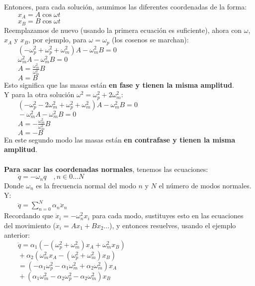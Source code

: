 \documentclass[a4paper,landscape,10pt]{cheatsheet}
\begin{document}
Entonces, para cada solución, asumimos las diferentes coordenadas de la forma:\\
$\qquad x_A=A\cos\omega t$\\
$\qquad x_B=B\cos\omega t$\\

Reemplazamos de nuevo (usando la primera ecuación es suficiente), ahora con $\omega$,
$x_A$ y $x_B$, por ejemplo, para $\omega=\omega_p$ (los cosenos se marchan):\\
$\qquad (-\omega_p^2+\omega_p^2+\omega_m^2)A-\omega_m^2B=0$\\
$\qquad \omega_m^2A-\omega_m^2B=0$\\
$\qquad A=\frac{\omega_m^2}{\omega_m^2}B$\\
$\qquad A=B$\\

Esto significa que las masas están \textbf{en fase y tienen la misma amplitud}.\\
Y para la otra solución $\omega^2=\omega_p^2+2\omega_m^2$:\\
$\qquad (-\omega_p^2-2\omega_m^2+\omega_p^2+\omega_m^2)A-\omega_m^2B=0$\\
$\qquad -\omega_m^2A-\omega_m^2B=0$\\
$\qquad A=-\frac{\omega_m^2}{\omega_m^2}B$\\
$\qquad A=-B$\\
En este segundo modo las masas están \textbf{en contrafase y tienen la misma amplitud}.\\
\hfill\\
\textbf{Para sacar las coordenadas normales}, tenemos las ecuaciones:\\
$\qquad \ddot{q}=-\omega_n q\quad,n\in{0...N}$\\
Donde $\omega_n$ es la frecuencia normal del modo $n$ y $N$ el número de modos normales. Y:\\
$\qquad \ddot{q}=\sum_{n=0}^{N}\alpha_n\ddot{x}_n$\\
Recordando que $\ddot{x}_i=-\omega_n^2x_i$ para cada modo, sustituyes esto en las ecuaciones del
movimiento ($\ddot{x}_i=Ax_1+Bx_2...$), y entonces resuelves, usando el ejemplo anterior:\\
$\qquad \ddot{q}=\alpha_1(-(\omega_p^2+\omega_m^2)x_A+\omega_m^2x_B)$\\
$\qquad +\alpha_2(\omega_m^2x_A-(\omega_p^2+\omega_m^2)x_B)$\\
$\qquad =(-\alpha_1\omega_p^2-\alpha_1\omega_m^2+\alpha_2\omega_m^2)x_A$\\
$\qquad +(\alpha_1\omega_m^2-\alpha_2\omega_p^2-\alpha_2\omega_m^2)x_B$\\
\end{document}
